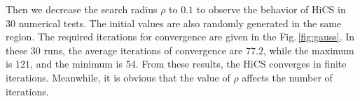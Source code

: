 \documentclass[mathpazo]{csam}
\theoremstyle{remark}
\begin{document}
Then we decrease the search radius $\rho$ to $0.1$ to observe the behavior of
HiCS in $30$ numerical tests. 
The initial values are also randomly generated in the same region.  
The required iterations for convergence are given in the
Fig.\,\ref{fig:gauss}.
In these $30$ runs, the average iterations of convergence are
$77.2$, while the maximum is $121$, and the minimum is $54$.
From these results, the HiCS converges in
finite iterations. Meanwhile, it is obvious that the value of
$\rho$ affects the number of iterations. 
\end{document}
